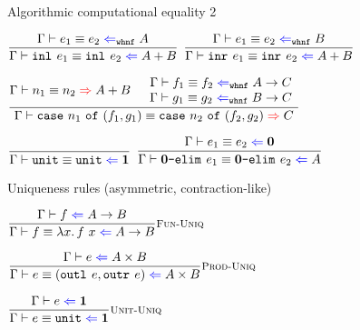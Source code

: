 \documentclass{beamer}
\begin{document}
\begin{frame}{Algorithmic computational equality 2}

\begin{center}
  $\infrule{\checkcompeqwhnf{e_1}{e_2}{A}}{\checkcompeq{\inl{e_1}}{\inl{e_2}}{\Sum{A}{B}}}$ \quad
  $\infrule{\checkcompeqwhnf{e_1}{e_2}{B}}{\checkcompeq{\inr{e_1}}{\inr{e_2}}{\Sum{A}{B}}}$

  \vspace{2em}

  $\infrule{\infercompeq{n_1}{n_2}{\Sum{A}{B}} \quad \begin{array}{c} \checkcompeqwhnf{f_1}{f_2}{\Fun{A}{C}} \\ \checkcompeqwhnf{g_1}{g_2}{\Fun{B}{C}} \end{array}}{\infercompeq{\case{n_1}{f_1}{g_1}}{\case{n_2}{f_2}{g_2}}{C}}$

  \vspace{2em}

  $\infrule{}{\checkcompeq{\unit}{\unit}{\Unit}}$ \quad
  $\infrule{\checkcompeq{e_1}{e_2}{\Empty}}{\checkcompeq{\emptyelim{e_1}}{\emptyelim{e_2}}{A}}$
\end{center}

\end{frame}

\begin{frame}{Uniqueness rules (asymmetric, contraction-like)}

\begin{center}
  $\infrule[Fun-Uniq]{\check{f}{\Fun{A}{B}}}{\checkcompeq{f}{\fun{x}{\app{f}{x}}}{\Fun{A}{B}}}$

  \vspace{2em}

  $\infrule[Prod-Uniq]{\check{e}{\Prod{A}{B}}}{\checkcompeq{e}{\pair{\outl{e}}{\outr{e}}}{\Prod{A}{B}}}$

  \vspace{2em}

  $\infrule[Unit-Uniq]{\check{e}{\Unit}}{\checkcompeq{e}{\unit}{\Unit}}$
\end{center}

\end{frame}
\end{document}
